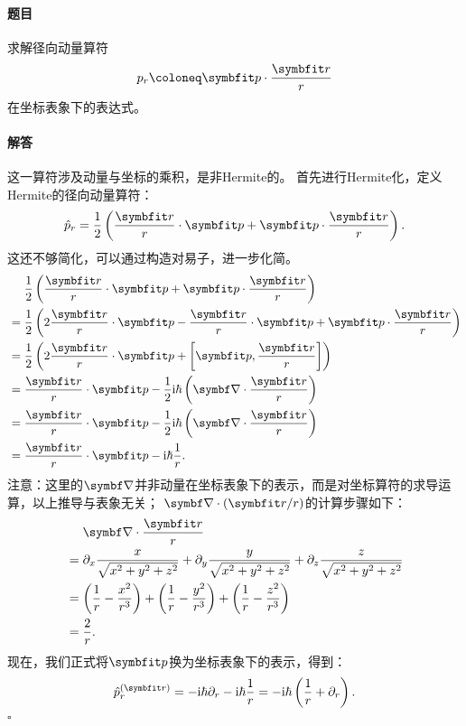 \begin{tcolorbox}[breakable, title={\textbf{径向动量算符}}]
    \paragraph{题目}
    求解径向动量算符
    \begin{equation}
        p_r \coloneq \pp \cdot \frac{\rr}{r}
    \end{equation}
    在坐标表象下的表达式。

    \paragraph{解答}
    这一算符涉及动量与坐标的乘积，是非Hermite的。
    首先进行Hermite化，定义Hermite的径向动量算符：
    \begin{equation}
        \hat{p}_r = \frac12 \left( \frac{\rr}{r}\cdot\pp + \pp\cdot\frac{\rr}{r} \right).
    \end{equation}
    这还不够简化，可以通过构造对易子，进一步化简。
    \begin{equation}
    \begin{aligned}
        &\quad\ \frac12 \left( \frac{\rr}{r}\cdot\pp + \pp\cdot\frac{\rr}{r} \right) \\
        &= \frac12 \left( 2\frac{\rr}{r}\cdot\pp - \frac{\rr}{r}\cdot\pp + \pp\cdot\frac{\rr}{r} \right) \\
        &= \frac12 \left( 2\frac{\rr}{r}\cdot\pp + \left[\pp, \frac{\rr}{r}\right] \right) \\
        &= \frac{\rr}{r}\cdot\pp - \frac12\ii\hbar\left(\del\cdot\frac{\rr}{r}\right) \\
        &= \frac{\rr}{r}\cdot\pp - \frac12\ii\hbar\left(\del\cdot\frac{\rr}{r}\right) \\
        &= \frac{\rr}{r}\cdot\pp - \ii\hbar\frac{1}{r}.
    \end{aligned}
    \end{equation}
    注意：这里的$\del$并非动量在坐标表象下的表示，而是对坐标算符的求导运算，以上推导与表象无关；
    $\del\cdot(\rr/r)$的计算步骤如下：
    \begin{equation}
    \begin{aligned}
        &\quad\ \del\cdot\frac{\rr}{r} \\
        &= \pd_x \frac{x}{\sqrt{x^2+y^2+z^2}} + \pd_y \frac{y}{\sqrt{x^2+y^2+z^2}} + \pd_z \frac{z}{\sqrt{x^2+y^2+z^2}} \\
        &= \left(\frac{1}{r} - \frac{x^2}{r^3}\right) + \left(\frac{1}{r} - \frac{y^2}{r^3}\right) + \left(\frac{1}{r} - \frac{z^2}{r^3}\right) \\
        &= \frac{2}{r}.
    \end{aligned}
    \end{equation}
    现在，我们正式将$\pp$换为坐标表象下的表示，得到：
    \begin{equation}
        \hat{p}^{(\rr)}_r = -\ii\hbar\pd_r - \ii\hbar\frac{1}{r} = -\ii\hbar\left(\frac{1}{r}+\pd_r\right).
    \end{equation}
    \hfill$\square$

\end{tcolorbox}


